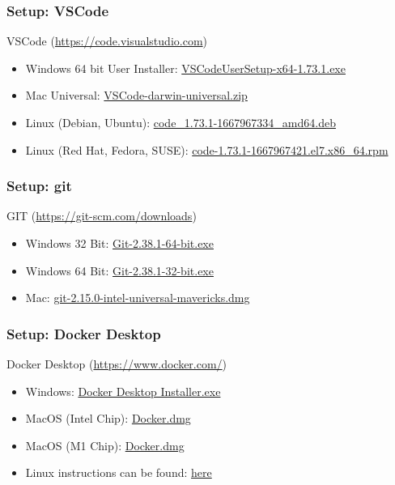 \documentclass[aspectratio=169]{beamer}
\begin{document}
\begin{frame}
    \frametitle{Setup: VSCode}
    VSCode (\href{https://code.visualstudio.com}{https://code.visualstudio.com})
    \begin{itemize}
	    \item Windows 64 bit User Installer: \href{https://prereqs.codemash.org/Files/VVSCodeUserSetup-x64-1.73.1.exe}{VSCodeUserSetup-x64-1.73.1.exe}
	    \item Mac Universal: \href{https://prereqs.codemash.org/Files/VSCode-darwin-universal.zip}{VSCode-darwin-universal.zip}
	    \item Linux (Debian, Ubuntu): \href{https://prereqs.codemash.org/Files/code_1.73.1-1667967334_amd64.deb}{code\_1.73.1-1667967334\_amd64.deb}
	    \item  Linux (Red Hat, Fedora, SUSE): \href{https://prereqs.codemash.org/Files/code-1.73.1-1667967421.el7.x86_64.rpm}{code-1.73.1-1667967421.el7.x86\_64.rpm}
    \end{itemize}
\end{frame}

\begin{frame}
	\frametitle{Setup: git}
		GIT (\href{https://git-scm.com/downloads}{https://git-scm.com/downloads})
        \begin{itemize}
        	\item Windows 32 Bit: \href{https://prereqs.codemash.org/Files/Git-2.38.1-64-bit.exe}{Git-2.38.1-64-bit.exe}
			\item Windows 64 Bit: \href{https://prereqs.codemash.org/Files/Git-2.38.1-32-bit.exe}{Git-2.38.1-32-bit.exe}
			\item Mac: \href{https://prereqs.codemash.org/Files/git-2.15.0-intel-universal-mavericks.dmg}{git-2.15.0-intel-universal-mavericks.dmg}
    	\end{itemize}
\end{frame}

\begin{frame}
	\frametitle{Setup: Docker Desktop}
	Docker Desktop (\href{https://www.docker.com/}{https://www.docker.com/})
	
	 	\begin{itemize}
	 		\item Windows: \href{https://prereqs.codemash.org/Files/Docker\%20Desktop\%20Installer.exe}{Docker Desktop Installer.exe}
			\item MacOS (Intel Chip): \href{https://prereqs.codemash.org/Files/Docker.dmg}{Docker.dmg}
			\item MacOS (M1 Chip): \href{https://prereqs.codemash.org/Files/Chip/Docker.dmg}{Docker.dmg}
			\item Linux instructions can be found: \href{https://docs.docker.com/desktop/install/linux-install/}{here}
	    \end{itemize}
\end{frame}
\end{document}
